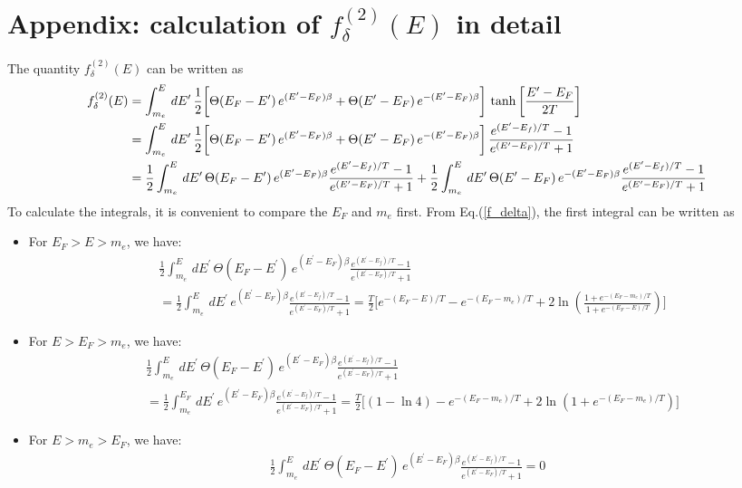 \documentclass[onecolumn,preprintnumbers,amsmath,amssymb]{revtex4}
\begin{document}

\section{Appendix: calculation of $f^{(2)}_\delta(E)$ in detail}
The quantity $f^{(2)}_\delta(E)$ can be written as
\begin{align}
\label{f_delta}
f^{(2)}_\delta(E)&=\int^{E}_{m_e}\,dE^\prime\,\frac{1}{2}\bigg[\Theta(E_F-E^\prime)\,e^{(E^\prime-E_F)\beta}+\Theta(E^\prime-E_F)\,e^{-(E^\prime-E_F)\beta}\bigg]\,\tanh\bigg[\frac{E^\prime-E_F}{2T}\bigg]\notag\\
&=\int^{E}_{m_e}\,dE^\prime\,\frac{1}{2}\bigg[\Theta(E_F-E^\prime)\,e^{(E^\prime-E_F)\beta}+\Theta(E^\prime-E_F)\,e^{-(E^\prime-E_F)\beta}\bigg]\,\frac{e^{(E^\prime-E_f)/T}-1}{e^{(E^\prime-E_F)/T}+1}\notag\\
&=\frac{1}{2}\int^{E}_{m_e}\,dE^\prime\,\Theta(E_F-E^\prime)\,e^{(E^\prime-E_F)\beta}\frac{e^{(E^\prime-E_f)/T}-1}{e^{(E^\prime-E_F)/T}+1}+\frac{1}{2}\int^{E}_{m_e}\,dE^\prime\,\Theta(E^\prime-E_F)\,e^{-(E^\prime-E_F)\beta}\frac{e^{(E^\prime-E_f)/T}-1}{e^{(E^\prime-E_F)/T}+1}
\end{align}
To calculate the integrals, it is convenient to compare the $E_F$ and $m_e$ first. From Eq.(\ref{f_delta}), the first integral can be written as
\begin{itemize}
\item For $E_F>E>m_e$, we have:
\begin{align}
&\frac{1}{2}\int^{E}_{m_e}\,dE^\prime\,\Theta(E_F-E^\prime)\,e^{(E^\prime-E_F)\beta}\frac{e^{(E^\prime-E_f)/T}-1}{e^{(E^\prime-E_F)/T}+1}\\&=\frac{1}{2}\int^{E}_{m_e}\,dE^\prime\,e^{(E^\prime-E_F)\beta}\frac{e^{(E^\prime-E_f)/T}-1}{e^{(E^\prime-E_F)/T}+1}=\frac{T}{2}\bigg[e^{-(E_F-E)/T} -e^{-(E_F-m_e)/T} + 2\ln{\left(\frac{1+e^{-(E_F-m_e)/T}}{1+e^{-(E_F-E)/T}}\right)}\bigg]
\end{align}
  \item For $E>E_F>m_e$, we have:
\begin{align}
&\frac{1}{2}\int^{E}_{m_e}\,dE^\prime\,\Theta(E_F-E^\prime)\,e^{(E^\prime-E_F)\beta}\frac{e^{(E^\prime-E_f)/T}-1}{e^{(E^\prime-E_F)/T}+1}\\&=\frac{1}{2}\int^{E_F}_{m_e}\,dE^\prime\,e^{(E^\prime-E_F)\beta}\frac{e^{(E^\prime-E_f)/T}-1}{e^{(E^\prime-E_F)/T}+1}=\frac{T}{2}\bigg[(1-\ln4)-e^{-(E_F-m_e)/T} + 2\ln{\left(1+e^{-(E_F-m_e)/T}\right)}\bigg]
\end{align}
  \item For $E>m_e>E_F$, we have:
\begin{align}
\frac{1}{2}\int^{E}_{m_e}\,dE^\prime\,\Theta(E_F-E^\prime)\,e^{(E^\prime-E_F)\beta}\frac{e^{(E^\prime-E_f)/T}-1}{e^{(E^\prime-E_F)/T}+1}=0
\end{align}
\end{itemize}
\end{document}
